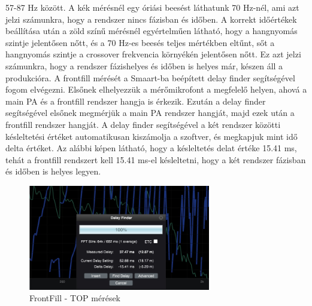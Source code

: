 57-87 Hz között. A kék mérésnél egy óriási beesést láthatunk 70 Hz-nél, ami azt jelzi számunkra, hogy a rendszer nincs fázisban és időben.
A korrekt időértékek beállítása után a zöld színű mérésnél egyértelműen látható, hogy a hangnyomás szintje jelentősen nőtt, és a 70 Hz-es
beesés teljes mértékben eltűnt, sőt a hangnyomás szintje a crossover frekvencia környékén jelentősen nőtt. Ez azt jelzi számunkra, hogy a rendszer
fázishelyes és időben is helyes már, készen áll a produkcióra.
A frontfill mérését a Smaart-ba beépített delay finder segítségével fogom elvégezni.
Elsőnek elhelyezzük a mérőmikrofont a megfelelő helyen, ahová a main PA és a frontfill rendszer hangja is érkezik.
Ezután a delay finder segítségével elsőnek megmérjük a main PA rendszer hangját, majd ezek után
a frontfill rendszer hangját. A delay finder segítségével a két rendszer közötti késleltetési értéket
automatikusan kiszámolja a szoftver, és megkapjuk mint idő delta értéket.
Az alábbi képen látható, hogy a késleltetés delat értéke 15.41 ms, tehát a frontfill rendszert kell
15.41 ms-el késleltetni, hogy a két rendszer fázisban és időben is helyes legyen.
\begin{figure}[H]
	\centering
	\includegraphics[width=300px, keepaspectratio]{figures/nearfill_smaart.jpg}
	\caption{FrontFill - TOP mérések}\label{fig:nearfill_smaart}
\end{figure}
